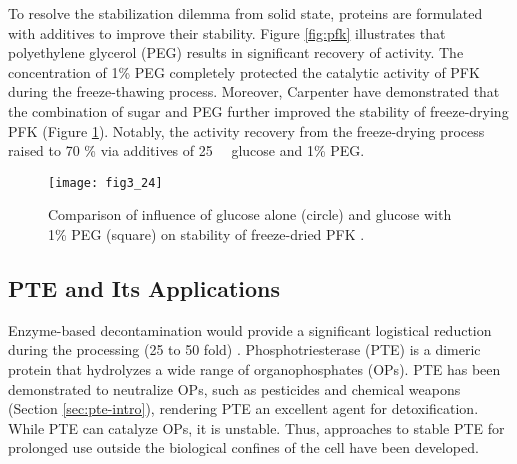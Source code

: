 \begin{refsection}
To resolve the stabilization dilemma from solid state, proteins are formulated
with additives to improve their stability. Figure \ref{fig:pfk} illustrates
that polyethylene glycerol (PEG) results in significant recovery of activity.
The concentration of 1\% PEG completely protected the catalytic activity of PFK
during the freeze-thawing process. Moreover, Carpenter  have
demonstrated that the combination of sugar and PEG further improved the
stability of freeze-drying PFK (Figure \ref{fig:pfk2}). Notably, the activity
recovery from the freeze-drying process raised to 70 \% via additives of
\SI{25}{\milli\Molar} glucose and 1\% PEG. 
\begin{figure}[htbp] \centering \texttt{[image: fig3\_24]}
    \caption[Comparison of influence of glucose alone (circle) and glucose with
    1\% PEG (square) on stability of freeze-dried PFK.]{Comparison of influence
        of glucose alone (circle) and glucose with 1\% PEG (square) on
        stability of freeze-dried PFK \cite{Carpenter1993}.} \label{fig:pfk2}
    \end{figure}

\subsection{PTE and Its Applications}

Enzyme-based decontamination would provide a significant logistical reduction
during the processing (25 to 50 fold) \cite{Defrank}. Phosphotriesterase (PTE)
is a dimeric protein that hydrolyzes a wide range of organophosphates (OPs).
PTE has been demonstrated to neutralize OPs, such as pesticides and chemical
weapons (Section \ref{sec:pte-intro}), rendering PTE an excellent
agent for detoxification. While PTE can catalyze OPs, it is unstable. Thus,
approaches to stable PTE for prolonged use outside the biological confines of
the cell have been developed. 


\end{refsection}
